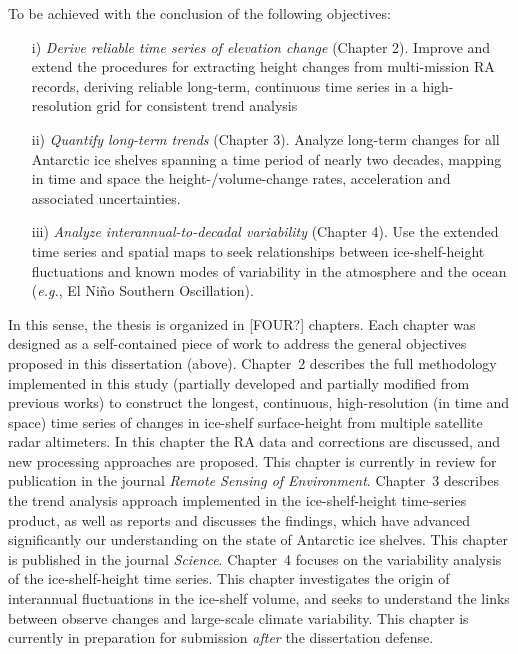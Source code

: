 To be achieved with the conclusion of the following objectives:

\begin{enumerate}
  \item[i)] {\it Derive reliable time series of elevation change} ({\sc Chapter 2}). Improve and
  extend the procedures for extracting height changes from multi-mission RA
  records, deriving reliable long-term, continuous time series in a
  high-resolution grid for consistent trend analysis
  \item[ii)] {\it Quantify long-term trends} ({\sc Chapter 3}). Analyze long-term changes for
  all Antarctic ice shelves spanning a time period of nearly two decades,
  mapping in time and space the height-/volume-change rates, acceleration
  and associated uncertainties.
  \item[iii)] {\it Analyze interannual-to-decadal variability} ({\sc Chapter 4}). Use the
  extended time series and spatial maps to seek relationships between
  ice-shelf-height fluctuations and known modes of variability in the
  atmosphere and the ocean ({\it e.g.}, El Ni\~{n}o Southern Oscillation).
\end{enumerate}

In this sense, the thesis is organized in [FOUR?] chapters. Each chapter was designed as a self-contained piece of work to address the general objectives proposed in this dissertation (above). {\sc Chapter~2} describes the full methodology implemented in this study (partially developed and partially modified from previous works) to construct the longest, continuous, high-resolution (in time and space) time series of changes in ice-shelf surface-height from multiple satellite radar altimeters. In this chapter the RA data and corrections are discussed, and new processing approaches are proposed. This chapter is currently in review for publication in the journal {\it Remote Sensing of Environment}. {\sc Chapter~3} describes the trend analysis approach implemented in the ice-shelf-height time-series product, as well as reports and discusses the findings, which have advanced significantly our understanding on the state of Antarctic ice shelves. This chapter is published in the journal {\it Science}. {\sc Chapter~4} focuses on the variability analysis of the ice-shelf-height time series. This chapter investigates the origin of interannual fluctuations in the ice-shelf volume, and seeks to understand the links between observe changes and large-scale climate variability. This chapter is currently in preparation for submission \emph{after} the dissertation defense.

